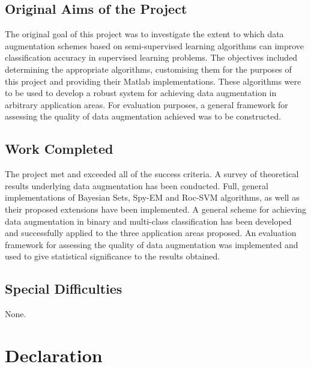 \documentclass[12pt,twoside,notitlepage,amsart]{report} %
\begin{document}
	
	\subsection*{Original Aims of the Project}	
		
	The original goal of this project was to investigate the extent to which data augmentation schemes based on semi-supervised learning algorithms can improve classification accuracy in supervised learning problems. The objectives included determining the appropriate algorithms, customising them for the purposes of this project and providing their Matlab implementations. These algorithms were to be used to develop a robust system for achieving data augmentation in arbitrary application areas. For evaluation purposes, a general framework for assessing the quality of data augmentation achieved was to be constructed.
	\subsection*{Work Completed}  %
	
	The project met and exceeded all of the success criteria. A survey of theoretical results underlying data augmentation has been conducted. Full, general implementations of Bayesian Sets, Spy-EM and Roc-SVM algorithms, as well as their proposed extensions have been implemented. A general scheme for achieving data augmentation in binary and multi-class classification has been developed and successfully applied to the three application areas proposed. An evaluation framework for assessing the quality of data augmentation was implemented and used to give statistical significance to the results obtained.
	
	\subsection*{Special Difficulties}
	
	None.
	 
	\newpage
	\section*{Declaration}
	
\end{document}

